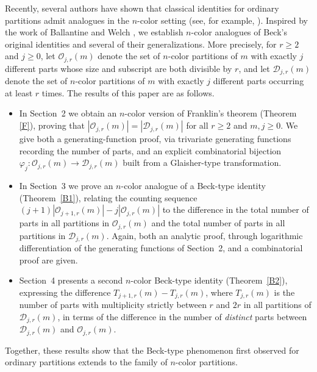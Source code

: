 \documentclass[reqno,12pt]{amsart}
\theoremstyle{definition}
\begin{document}
Recently, several authors have shown that classical identities for ordinary partitions admit analogues in the $n$-color setting (see, for example, \cite{Bandyopadhyay-Baruah21, Sharma-Kaur25, NR26}).
Inspired by the work of Ballantine and Welch \cite{BW21, BW23}, we establish $n$-color analogues of Beck's original identities and several of their generalizations. More precisely, for $r \ge 2$ and $j \ge 0$, let $\mathcal{O}_{j,r}(m)$ denote the set of $n$-color partitions of $m$ with exactly $j$ different parts whose size and subscript  are both divisible by $r$, and let $\mathcal{D}_{j,r}(m)$ denote the set of $n$-color partitions of $m$ with exactly $j$ different parts occurring at least $r$ times. The results of this paper are as follows.
\begin{itemize}
    
\item In Section~2 we obtain an $n$-color version of Franklin's theorem (Theorem \ref{F}), proving that $|\mathcal{O}_{j,r}(m)| = |\mathcal{D}_{j,r}(m)|$ for all $r \ge 2$ and $m, j \ge 0$. We give both a generating-function proof, via trivariate generating functions recording the number of parts, and an explicit combinatorial bijection $\varphi_j : \mathcal{O}_{j,r}(m) \to \mathcal{D}_{j,r}(m)$ built from a Glaisher-type transformation.

\item In Section~3 we prove an $n$-color analogue of a Beck-type identity (Theorem~\ref{B1}), relating the counting sequence $(j+1)|\mathcal{O}_{j+1,r}(m)| - j|\mathcal{O}_{j,r}(m)|$ to the difference in the total number of parts in all partitions in $\mathcal{O}_{j,r}(m)$ and the total number of parts in all partitions in $\mathcal{D}_{j,r}(m)$. Again, both an analytic proof, through logarithmic differentiation of the generating functions of Section~2, and a combinatorial proof are given.

\item Section~4 presents a second $n$-color Beck-type identity (Theorem~\ref{B2}), expressing the difference $T_{j+1,r}(m) - T_{j,r}(m)$, where $T_{j,r}(m)$ is the number of parts with multiplicity strictly between $r$ and $2r$ in all partitions of $\mathcal{D}_{j,r}(m)$, in terms of the difference in the number of \emph{distinct} parts between $\mathcal{D}_{j,r}(m)$ and $\mathcal{O}_{j,r}(m)$.
\end{itemize}

Together, these results show that the Beck-type phenomenon first observed for ordinary partitions extends to the family of $n$-color partitions.
\end{document}
